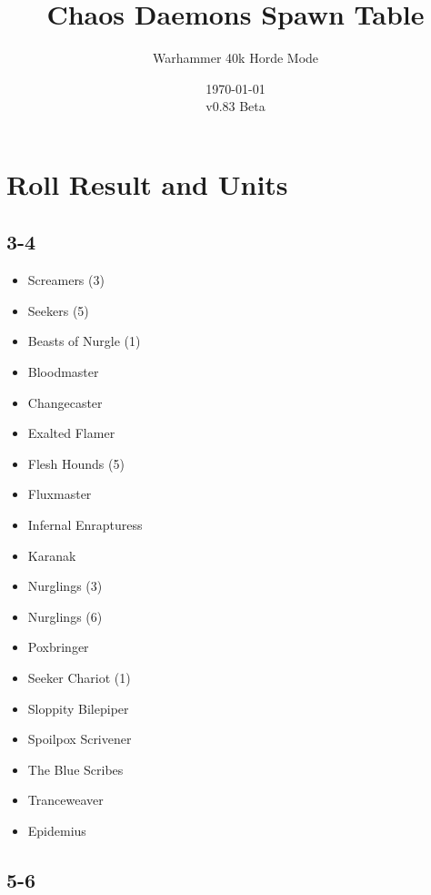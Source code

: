 \documentclass{HordeModeTarot}
\title{Chaos Daemons Spawn Table}
\author{Warhammer 40k Horde Mode}
\date{\today \\v0.83 Beta}
\begin{document}
\maketitle

\outputUsingSpawnTableBoilerplate
\section{Roll Result and Units}\hypertarget{roll-results}{}\label{roll-results}

\begin{multicols}{2}

\subsection*{3-4}

\begin{itemize}[leftmargin=*]
\item[] Screamers (3)
\item[] Seekers (5)
\item[] Beasts of Nurgle (1)
\item[] Bloodmaster
\item[] Changecaster
\item[] Exalted Flamer
\item[] Flesh Hounds (5)
\item[] Fluxmaster
\item[] Infernal Enrapturess
\item[] Karanak
\item[] Nurglings (3)
\item[] Nurglings (6)
\item[] Poxbringer
\item[] Seeker Chariot (1)
\item[] Sloppity Bilepiper
\item[] Spoilpox Scrivener
\item[] The Blue Scribes
\item[] Tranceweaver
\item[] Epidemius
\end{itemize}

\subsection*{5-6}


\end{multicols}
\end{document}
